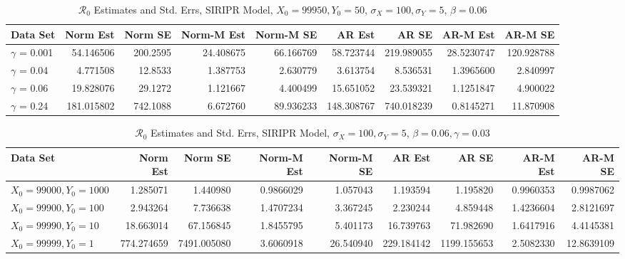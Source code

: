 \documentclass[12pt]{article}
\newcommand{\rr}{\ensuremath{\mathcal{R}_0}}
\begin{document}
\begin{table}[H]
	
	\caption{\label{tab:}$\rr$ Estimates and Std. Errs, SIRIPR Model,
		$X_0 = 99950, Y_0 = 50$, $\sigma_X = 100, \sigma_Y = 5$, $\beta = 0.06$}
	\centering
	\begin{footnotesize}
		\begin{tabular}[t]{l|r|r|r|r|r|r|r|r}
			\hline
			Data Set & Norm Est & Norm SE & Norm-M Est & Norm-M SE & AR Est & AR SE & AR-M Est & AR-M SE\\
			\hline
			$\gamma$ = 0.001 & 54.146506 & 200.2595 & 24.408675 & 66.166769 & 58.723744 & 219.989055 & 28.5230747 & 120.928788\\
			\hline
			$\gamma$ = 0.04 & 4.771508 & 12.8533 & 1.387753 & 2.630779 & 3.613754 & 8.536531 & 1.3965600 & 2.840997\\
			\hline
			$\gamma$ = 0.06 & 19.828076 & 29.1272 & 1.121667 & 4.400499 & 15.651052 & 23.539321 & 1.1251847 & 4.900022\\
			\hline
			$\gamma$ = 0.24 & 181.015802 & 742.1088 & 6.672760 & 89.936233 & 148.308767 & 740.018239 & 0.8145271 & 11.870908\\
			\hline
		\end{tabular}
	\end{footnotesize}
\end{table}

\begin{table}[H]
	
	\caption{\label{tab:}$\rr$ Estimates and Std. Errs, SIRIPR Model,
		$\sigma_X = 100, \sigma_Y = 5$, $\beta = 0.06, \gamma = 0.03$}
	\centering
	\begin{footnotesize}
		\begin{tabular}[t]{l|r|r|r|r|r|r|r|r}
			\hline
			Data Set & Norm Est & Norm SE & Norm-M Est & Norm-M SE & AR Est & AR SE & AR-M Est & AR-M SE\\
			\hline
			$X_0 = 99000, Y_0 = 1000$ & 1.285071 & 1.440980 & 0.9866029 & 1.057043 & 1.193594 & 1.195820 & 0.9960353 & 0.9987062\\
			\hline
			$X_0 = 99900, Y_0 = 100$ & 2.943264 & 7.736638 & 1.4707234 & 3.367245 & 2.230244 & 4.859448 & 1.4236604 & 2.8121697\\
			\hline
			$X_0 = 99990, Y_0 = 10$ & 18.663014 & 67.156845 & 1.8455795 & 5.401173 & 16.739763 & 71.982690 & 1.6417916 & 4.4145381\\
			\hline
			$X_0 = 99999, Y_0 = 1$ & 774.274659 & 7491.005080 & 3.6060918 & 26.540940 & 229.184142 & 1199.155653 & 2.5082330 & 12.8639109\\
			\hline
		\end{tabular}
	\end{footnotesize}
\end{table}
\end{document}
